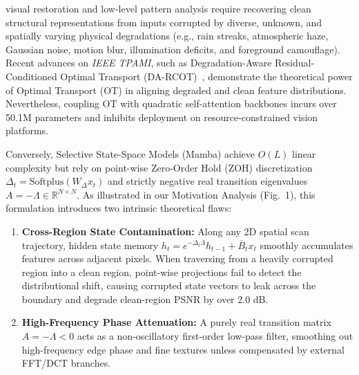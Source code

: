 \documentclass[10pt,journal,compsoc]{IEEEtran}
\begin{document}
\maketitle
\IEEEdisplaynontitleabstractindextext
\IEEEpeerreviewmaketitle

 visual restoration and low-level pattern analysis require recovering clean structural representations from inputs corrupted by diverse, unknown, and spatially varying physical degradations (e.g., rain streaks, atmospheric haze, Gaussian noise, motion blur, illumination deficits, and foreground camouflage). Recent advances on \emph{IEEE TPAMI}, such as Degradation-Aware Residual-Conditioned Optimal Transport (DA-RCOT)~\cite{tang2025darcot}, demonstrate the theoretical power of Optimal Transport (OT) in aligning degraded and clean feature distributions. Nevertheless, coupling OT with quadratic self-attention backbones incurs over 50.1M parameters and inhibits deployment on resource-constrained vision platforms.

Conversely, Selective State-Space Models (Mamba) achieve $O(L)$ linear complexity but rely on point-wise Zero-Order Hold (ZOH) discretization $\Delta_t = \mathrm{Softplus}(W_\Delta x_t)$ and strictly negative real transition eigenvalues $A = -\Lambda \in \mathbb{R}^{N \times N}$. As illustrated in our Motivation Analysis (Fig.~1), this formulation introduces two intrinsic theoretical flaws:
\begin{enumerate}
    \item \textbf{Cross-Region State Contamination:} Along any 2D spatial scan trajectory, hidden state memory $h_t = e^{-\Delta_t \Lambda} h_{t-1} + \overline{B}_t x_t$ smoothly accumulates features across adjacent pixels. When traversing from a heavily corrupted region into a clean region, point-wise projections fail to detect the distributional shift, causing corrupted state vectors to leak across the boundary and degrade clean-region PSNR by over $2.0\text{ dB}$.
    \item \textbf{High-Frequency Phase Attenuation:} A purely real transition matrix $A = -\Lambda < 0$ acts as a non-oscillatory first-order low-pass filter, smoothing out high-frequency edge phase and fine textures unless compensated by external FFT/DCT branches.
\end{enumerate}
\end{document}
